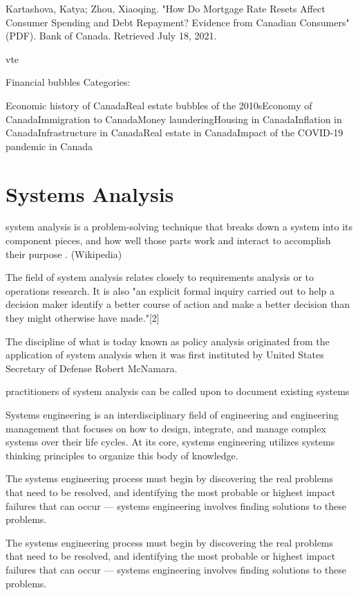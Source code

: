     Kartashova, Katya; Zhou, Xiaoqing. "How Do Mortgage Rate Resets Affect Consumer Spending and Debt Repayment? Evidence from Canadian Consumers" (PDF). Bank of Canada. Retrieved July 18, 2021.

    vte

Financial bubbles
Categories:

    Economic history of CanadaReal estate bubbles of the 2010sEconomy of CanadaImmigration to CanadaMoney launderingHousing in CanadaInflation in CanadaInfrastructure in CanadaReal estate in CanadaImpact of the COVID-19 pandemic in Canada



\section{Systems Analysis}
 
 system analysis is a problem-solving technique that breaks down a system into its component pieces, and how well those parts work and interact to accomplish their purpose . (Wikipedia)

The field of system analysis relates closely to requirements analysis or to operations research. It is also "an explicit formal inquiry carried out to help a decision maker identify a better course of action and make a better decision than they might otherwise have made."[2] 

The discipline of what is today known as policy analysis originated from the application of system analysis when it was first instituted by United States Secretary of Defense Robert McNamara.

practitioners of system analysis can be called upon to document existing systems 

Systems engineering is an interdisciplinary field of engineering and engineering management that focuses on how to design, integrate, and manage complex systems over their life cycles. At its core, systems engineering utilizes systems thinking principles to organize this body of knowledge. 

The systems engineering process must begin by discovering the real problems that need to be resolved, and identifying the most probable or highest impact failures that can occur — systems engineering involves finding solutions to these problems. 

The systems engineering process must begin by discovering the real problems that need to be resolved, and identifying the most probable or highest impact failures that can occur — systems engineering involves finding solutions to these problems. 


